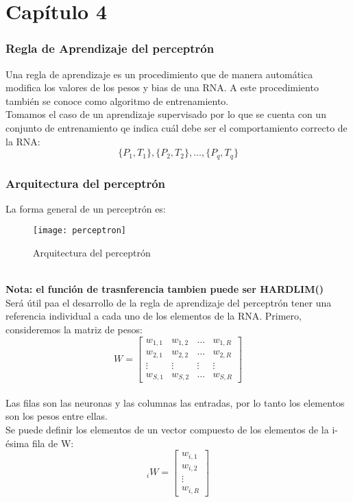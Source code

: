 \documentclass{article}
\begin{document}
\part{Capítulo 4}
\section{Regla de Aprendizaje del perceptrón}
Una regla de aprendizaje es un procedimiento que de manera automática modifica los valores de los pesos y bias de una RNA. A este procedimiento también se conoce como algoritmo de entrenamiento.\\
Tomamos el caso de un aprendizaje supervisado por lo que se cuenta con un conjunto de entrenamiento qe indica cuál debe ser el comportamiento correcto de la RNA:
$$ \{P_1,T_1\}, \{P_2,T_2\}, \dots, \{P_q,T_q\} $$
\newpage
\section{Arquitectura del perceptrón}
La forma general de un perceptrón es:\\
\begin{figure}[h!]
	\caption{Arquitectura del perceptrón}
	\centering
	\texttt{[image: perceptron]}
\end{figure}\\
\textbf{Nota: el función de trasnferencia tambien puede ser HARDLIM()}\\
Será útil paa el desarrollo de la regla de aprendizaje del perceptrón tener una referencia individual a cada uno de los elementos de la RNA. Primero, consideremos la matriz de pesos:\\
\[W=
	\begin{bmatrix}
	w_{1,1} & w_{1,2}& \dots & w_{1,R}\\
	w_{2,1} & w_{2,2}& \dots & w_{2,R}\\
	\vdots  & \vdots & \vdots & \vdots\\
	w_{S,1} & w_{S,2}& \dots & w_{S,R}
	\end{bmatrix}
\]\\
Las filas son las neuronas y las columnas las entradas, por lo tanto los elementos son los pesos entre ellas.\\
Se puede definir los elementos de un vector compuesto de los elementos de la i-ésima fila de W:
\[_iW=
\begin{bmatrix}
w_{i,1}\\
w_{i,2}\\
\vdots\\
w_{i,R}
\end{bmatrix}
\]\\
\end{document}
